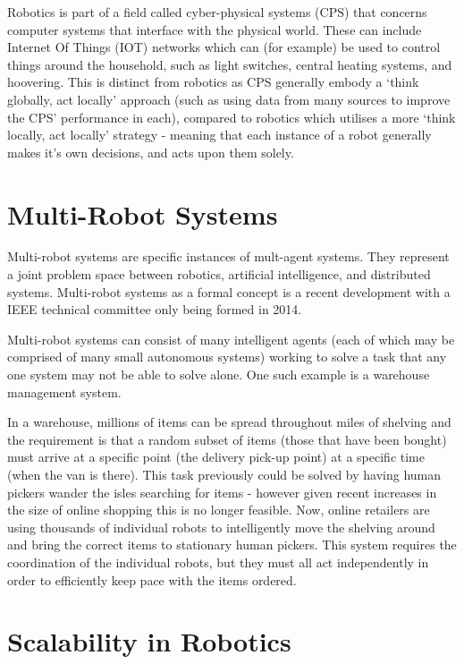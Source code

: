 \documentclass{l4proj}
\begin{document}
Robotics is part of a field called cyber-physical systems (CPS) that concerns computer systems that interface with the physical world. These can include Internet Of Things (IOT) networks which can (for example) be used to control things around the household, such as light switches, central heating systems, and hoovering. This is distinct from robotics as CPS generally embody a `think globally, act locally' approach (such as using data from many sources to improve the CPS' performance in each), compared to robotics which utilises a more `think locally, act locally' strategy - meaning that each instance of a robot generally makes it's own decisions, and acts upon them solely.

\section{Multi-Robot Systems}

Multi-robot systems are specific instances of mult-agent systems. They represent a joint problem space between robotics, artificial intelligence, and distributed systems. Multi-robot systems as a formal concept is a recent development with a IEEE technical committee only being formed in 2014\cite{MultiRobotSystemsIEEECommittee}.

Multi-robot systems can consist of many intelligent agents (each of which may be comprised of many small autonomous systems) working to solve a task that any one system may not be able to solve alone. One such example is a warehouse management system. 

In a warehouse, millions of items can be spread throughout miles of shelving and the requirement is that a random subset of items (those that have been bought) must arrive at a specific point (the delivery pick-up point) at a specific time (when the van is there). This task previously could be solved by having human pickers wander the isles searching for items - however given recent increases in the size of online shopping this is no longer feasible. Now, online retailers are using thousands of individual robots to intelligently move the shelving around and bring the correct items to stationary human pickers. This system requires the coordination of the individual robots, but they must all act independently in order to efficiently keep pace with the items ordered.

\section{Scalability in Robotics}
\end{document}

